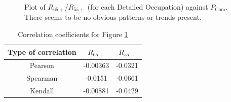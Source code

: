 \documentclass[11pt]{article}
\begin{document}
\begin{figure}[!htb]
	\centering
	\hfill
	\hfill
	\caption{Plot of $R_{65+}$/$R_{55+}$ (for each Detailed Occupation) against $P_{\text{Com}}$. There seems to be no obvious patterns or trends present.}
	\label{fig:EP/OP against PCom}
\end{figure}



\begin{table}[]
\centering
\begin{tabular}{@{}ccc@{}}
\toprule
\textbf{Type of correlation} & \textbf{$R_{65+}$} & \textbf{$R_{55+}$} \\ \midrule
Pearson                      & -0.00363    & -0.0321     \\
Spearman                     & -0.0151     & -0.0661     \\
Kendall                      & -0.00881    & -0.0429    \\ \bottomrule
\end{tabular}
\caption{Correlation coefficients for Figure \ref{fig:EP/OP against PCom}}
\label{tab:correlation}
\end{table}
\end{document}
